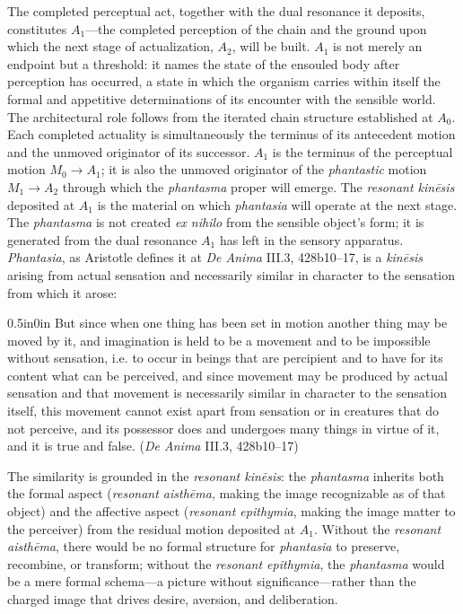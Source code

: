 \documentclass{article}
\begin{document}
The completed perceptual act, together with the dual resonance it deposits, constitutes $A_1$---the completed perception of the chain and the ground upon which the next stage of actualization, $A_2$, will be built. $A_1$ is not merely an endpoint but a threshold: it names the state of the ensouled body after perception has occurred, a state in which the organism carries within itself the formal and appetitive determinations of its encounter with the sensible world. The architectural role follows from the iterated chain structure established at $A_0$. Each completed actuality is simultaneously the terminus of its antecedent motion and the unmoved originator of its successor. $A_1$ is the terminus of the perceptual motion $M_0 \rightarrow A_1$; it is also the unmoved originator of the \textit{phantastic} motion $M_1 \rightarrow A_2$ through which the \textit{phantasma} proper will emerge. The \textit{resonant kinēsis} deposited at $A_1$ is the material on which \textit{phantasia} will operate at the next stage. The \textit{phantasma} is not created \textit{ex nihilo} from the sensible object's form; it is generated from the dual resonance $A_1$ has left in the sensory apparatus. \textit{Phantasia}, as Aristotle defines it at \textit{De Anima} III.3, 428b10--17, is a \textit{kinēsis} arising from actual sensation and necessarily similar in character to the sensation from which it arose:
\begin{adjustwidth}{0.5in}{0in}
But since when one thing has been set in motion another thing may be moved by it, and imagination is held to be a movement and to be impossible without sensation, i.e. to occur in beings that are percipient and to have for its content what can be perceived, and since movement may be produced by actual sensation and that movement is necessarily similar in character to the sensation itself, this movement cannot exist apart from sensation or in creatures that do not perceive, and its possessor does and undergoes many things in virtue of it, and it is true and false. (\textit{De Anima} III.3, 428b10--17)
\end{adjustwidth}
The similarity is grounded in the \textit{resonant kinēsis}: the \textit{phantasma} inherits both the formal aspect (\textit{resonant aisthēma}, making the image recognizable as of that object) and the affective aspect (\textit{resonant epithymia}, making the image matter to the perceiver) from the residual motion deposited at $A_1$. Without the \textit{resonant aisthēma}, there would be no formal structure for \textit{phantasia} to preserve, recombine, or transform; without the \textit{resonant epithymia}, the \textit{phantasma} would be a mere formal schema---a picture without significance---rather than the charged image that drives desire, aversion, and deliberation.
\end{document}
